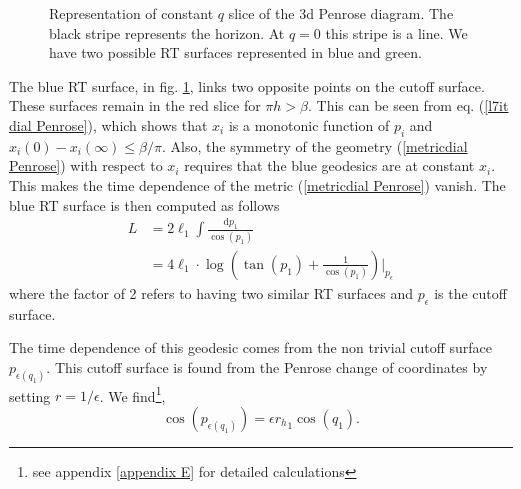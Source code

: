 \begin{figure}
    \centering
    \caption{Representation of constant $q$ slice of the 3d Penrose diagram. The black stripe represents the horizon. At $q=0$ this stripe is a line. We have two possible RT surfaces represented in blue and green.}
    \label{aua'}
\end{figure}

The blue RT surface, in fig. \ref{aua'}, links two opposite points on the cutoff surface. These surfaces remain in the red slice for $\pi h>\beta$. This can be seen from eq. (\ref{l7it dial Penrose}), which shows that $x_i$ is a monotonic function of $p_i$ and $x_i(0)-x_i(\infty)\leq \beta/\pi$. Also, the symmetry of the geometry (\ref{metricdial Penrose}) with respect to $x_i$ requires that the blue geodesics are at constant $x_i$. This makes the time dependence of the metric (\ref{metricdial Penrose}) vanish. The blue RT surface is then computed as follows
\begin{align}\label{thela Lagrangian}
    L &= 2\ell_1\int\frac{\text{d}p_1}{\cos(p_1)}\\
    &= 4\ell_1\cdot\log\left(\tan(p_1)+\frac{1}{\cos(p_1)}\right)\bigg|_{p_{\epsilon}}
\end{align}
where the factor of 2 refers to having two similar RT surfaces and $p_\epsilon$ is the cutoff surface.

The time dependence of this geodesic comes from the non trivial cutoff surface ${p_{\epsilon(q_1)}}$. This cutoff surface is found from the Penrose change of coordinates by setting $r=1/\epsilon$. We find\footnote{see appendix \ref{appendix E} for detailed calculations},
\begin{equation}
    \cos({p_{\epsilon(q_1)}}) = \epsilon{r_h}_1\cos(q_1).
\end{equation}

